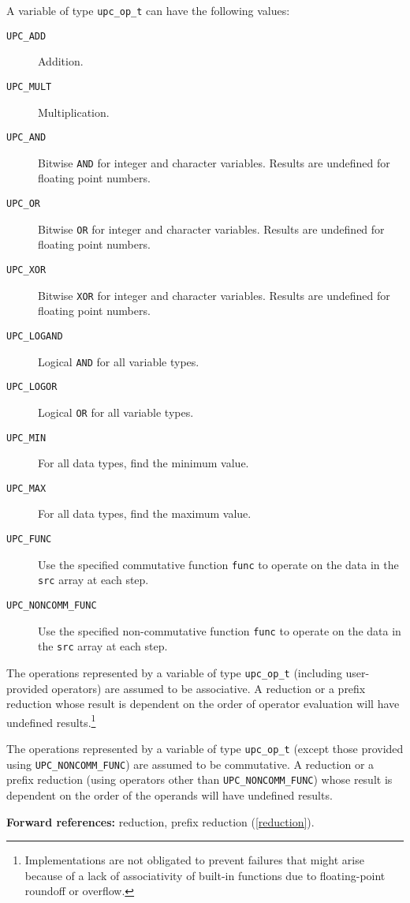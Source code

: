 \documentclass[12pt,titlepage]{article}
\newcounter{parnum}
\newcommand\np{\addtocounter{parnum}{1}\hspace{-2em}\makebox[2em][l]{\arabic{parnum}}}
\begin{document}
\np
\label{upc-op-t-item}
A variable of type {\tt upc\_op\_t} can have the following values:
\begin{description}
\item[{\tt UPC\_ADD}]
Addition.
\item[{\tt UPC\_MULT}]
Multiplication.
\item[{\tt UPC\_AND}]
Bitwise {\tt AND} for integer and character variables.
Results are undefined for floating point numbers.
\item[{\tt UPC\_OR}]
Bitwise {\tt OR} for integer and character variables.
Results are undefined for floating point numbers.
\item[{\tt UPC\_XOR}]
Bitwise {\tt XOR} for integer and character variables.
Results are undefined for floating point numbers.
\item[{\tt UPC\_LOGAND}]
Logical {\tt AND} for all variable types.
\item[{\tt UPC\_LOGOR}]
Logical {\tt OR} for all variable types.
\item[{\tt UPC\_MIN}]
For all data types, find the minimum value.
\item[{\tt UPC\_MAX}]
For all data types, find the maximum value.
\item[{\tt UPC\_FUNC}]
Use the specified commutative function {\tt func} to operate
on the data in the {\tt src} array at each step.
\item[{\tt UPC\_NONCOMM\_FUNC}]
Use the specified non-commutative function {\tt func} to
operate on the data in the {\tt src} array at each step.
\end{description}

\np The operations represented by a variable of type {\tt upc\_op\_t}
(including user-provided operators) are assumed to be associative.
A reduction or a prefix reduction whose result is dependent on the
order of operator evaluation will have undefined results.\footnote{
Implementations are not obligated to prevent failures that
might arise because of a lack of associativity of built-in functions
due to floating-point roundoff or overflow.}

\np The operations represented by a variable of type {\tt upc\_op\_t}
(except those provided using {\tt UPC\_NONCOMM\_FUNC}) are assumed
to be commutative.  A reduction or a prefix reduction (using operators
other than {\tt UPC\_NONCOMM\_FUNC}) whose result is dependent on
the order of the operands will have undefined results.

{\bf Forward references:} reduction, prefix reduction (\ref{reduction}).
\end{document}
